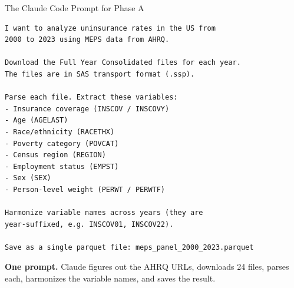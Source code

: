 \documentclass[10pt,english,aspectratio=169]{beamer}
\begin{document}
\begin{frame}[fragile]{The Claude Code Prompt for Phase A}

\begin{lstlisting}[style=pythonstyle, language={}, basicstyle=\ttfamily\scriptsize]
I want to analyze uninsurance rates in the US from
2000 to 2023 using MEPS data from AHRQ.

Download the Full Year Consolidated files for each year.
The files are in SAS transport format (.ssp).

Parse each file. Extract these variables:
- Insurance coverage (INSCOV / INSCOVY)
- Age (AGELAST)
- Race/ethnicity (RACETHX)
- Poverty category (POVCAT)
- Census region (REGION)
- Employment status (EMPST)
- Sex (SEX)
- Person-level weight (PERWT / PERWTF)

Harmonize variable names across years (they are
year-suffixed, e.g. INSCOV01, INSCOV22).

Save as a single parquet file: meps_panel_2000_2023.parquet
\end{lstlisting}

\vspace{0.1cm}
\textbf{One prompt.} Claude figures out the AHRQ URLs, downloads 24 files, parses each, harmonizes the variable names, and saves the result.

\end{frame}
\end{document}

